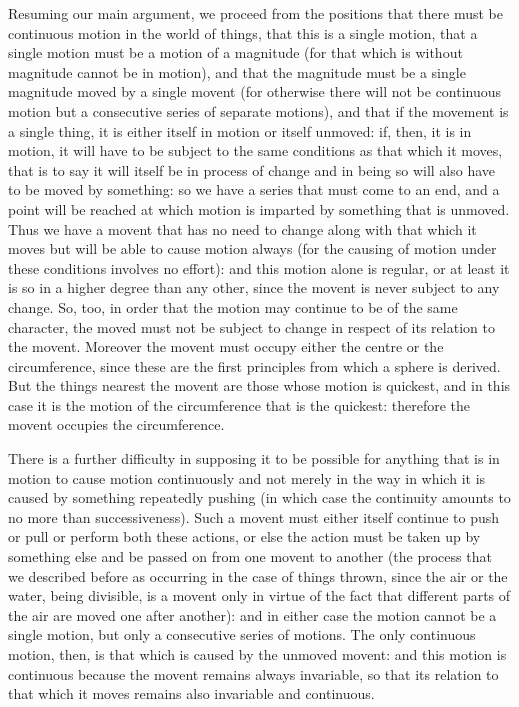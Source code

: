 Resuming our main argument, we proceed from the positions that there
must be continuous motion in the world of things, that this is a single
motion, that a single motion must be a motion of a magnitude (for
that which is without magnitude cannot be in motion), and that the
magnitude must be a single magnitude moved by a single movent (for
otherwise there will not be continuous motion but a consecutive series
of separate motions), and that if the movement is a single thing,
it is either itself in motion or itself unmoved: if, then, it is in
motion, it will have to be subject to the same conditions as that
which it moves, that is to say it will itself be in process of change
and in being so will also have to be moved by something: so we have
a series that must come to an end, and a point will be reached at
which motion is imparted by something that is unmoved. Thus we have
a movent that has no need to change along with that which it moves
but will be able to cause motion always (for the causing of motion
under these conditions involves no effort): and this motion alone
is regular, or at least it is so in a higher degree than any other,
since the movent is never subject to any change. So, too, in order
that the motion may continue to be of the same character, the moved
must not be subject to change in respect of its relation to the movent.
Moreover the movent must occupy either the centre or the circumference,
since these are the first principles from which a sphere is derived.
But the things nearest the movent are those whose motion is quickest,
and in this case it is the motion of the circumference that is the
quickest: therefore the movent occupies the circumference.

There is a further difficulty in supposing it to be possible for anything
that is in motion to cause motion continuously and not merely in the
way in which it is caused by something repeatedly pushing (in which
case the continuity amounts to no more than successiveness). Such
a movent must either itself continue to push or pull or perform both
these actions, or else the action must be taken up by something else
and be passed on from one movent to another (the process that we described
before as occurring in the case of things thrown, since the air or
the water, being divisible, is a movent only in virtue of the fact
that different parts of the air are moved one after another): and
in either case the motion cannot be a single motion, but only a consecutive
series of motions. The only continuous motion, then, is that which
is caused by the unmoved movent: and this motion is continuous because
the movent remains always invariable, so that its relation to that
which it moves remains also invariable and continuous. 

